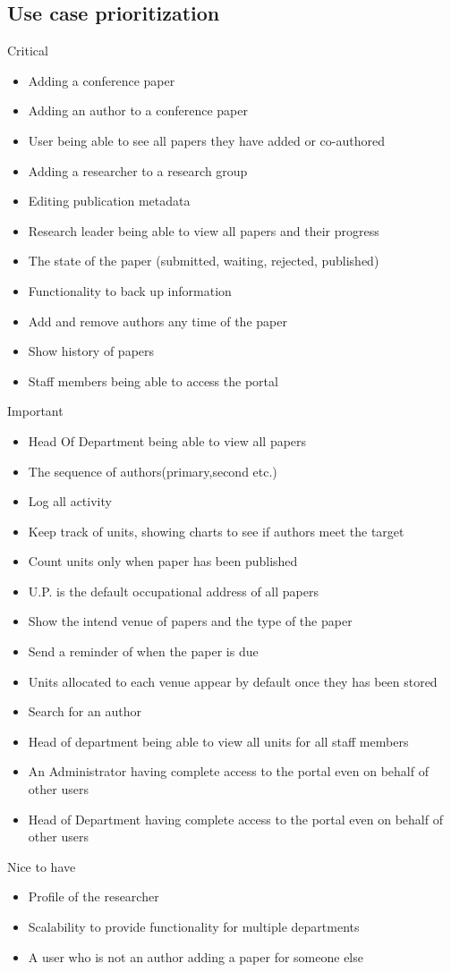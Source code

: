 \documentclass[a4paper,12pt]{article}
\begin{document}
\subsection{Use case prioritization}
Critical
\begin{itemize}
\item Adding a conference paper
\item Adding an author to a conference paper
\item User being able to see all papers they have added or co-authored
\item Adding a researcher to a research group
\item Editing publication metadata 
\item Research leader being able to view all papers and their progress
\item The state of the paper (submitted, waiting, rejected, published)
\item Functionality to back up information 
\item Add and remove authors any time of the paper
\item Show history of papers
\item Staff members being able to access the portal

\end{itemize}
Important
\begin{itemize}
\item Head Of Department being able to view all papers
\item The sequence of authors(primary,second etc.)
\item Log all activity 
\item Keep track of units, showing charts to see if authors meet the target
\item Count units only when paper has been published
\item U.P. is the default occupational address of all papers
\item Show the intend venue of papers and the type of the paper
\item Send a reminder of when the paper is due
\item Units allocated to each venue appear by default once they has been stored
\item Search for an author
\item Head of department being able to view all units for all staff members
\item An Administrator having complete access to the portal even on behalf of other users
\item Head of Department having complete access to the portal even on behalf of other users
\end{itemize}
Nice to have
\begin{itemize}
 \item Profile of the researcher
 \item Scalability to provide functionality for multiple departments
 \item A user who is not an author adding a paper for someone else
\end{itemize}
\end{document}
